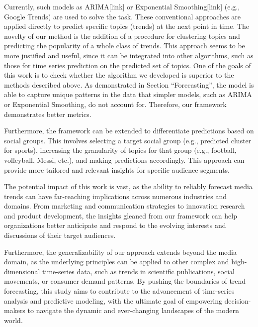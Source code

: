 Currently, such models as ARIMA[link] or Exponential Smoothing[link] (e.g., Google Trends) are used to solve the task. These conventional approaches are applied directly to predict specific topics (trends) at the next point in time. The novelty of our method is the addition of a procedure for clustering topics and predicting the popularity of a whole class of trends. This approach seems to be more justified and useful, since it can be integrated into other algorithms, such as those for time series prediction on the predicted set of topics. One of the goals of this work is to check whether the algorithm we developed is superior to the methods described above. As demonstrated in Section “Forecasting”, the model is able to capture unique patterns in the data that simpler models, such as ARIMA or Exponential Smoothing, do not account for. Therefore, our framework demonstrates better metrics.

Furthermore, the framework can be extended to differentiate predictions based on social groups. This involves selecting a target social group (e.g., predicted cluster for sports), increasing the granularity of topics for that group (e.g., football, volleyball, Messi, etc.), and making predictions accordingly. This approach can provide more tailored and relevant insights for specific audience segments.

The potential impact of this work is vast, as the ability to reliably forecast media trends can have far-reaching implications across numerous industries and domains. From marketing and communication strategies to innovation research and product development, the insights gleaned from our framework can help organizations better anticipate and respond to the evolving interests and discussions of their target audiences.

Furthermore, the generalizability of our approach extends beyond the media domain, as the underlying principles can be applied to other complex and high-dimensional time-series data, such as trends in scientific publications, social movements, or consumer demand patterns. By pushing the boundaries of trend forecasting, this study aims to contribute to the advancement of time-series analysis and predictive modeling, with the ultimate goal of empowering decision-makers to navigate the dynamic and ever-changing landscapes of the modern world.









